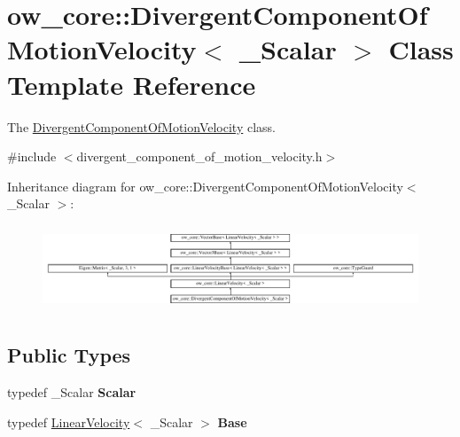 \hypertarget{classow__core_1_1DivergentComponentOfMotionVelocity}{}\section{ow\+\_\+core\+:\+:Divergent\+Component\+Of\+Motion\+Velocity$<$ \+\_\+\+Scalar $>$ Class Template Reference}
\label{classow__core_1_1DivergentComponentOfMotionVelocity}


The \hyperlink{classow__core_1_1DivergentComponentOfMotionVelocity}{Divergent\+Component\+Of\+Motion\+Velocity} class.  




{\ttfamily \#include $<$divergent\+\_\+component\+\_\+of\+\_\+motion\+\_\+velocity.\+h$>$}

Inheritance diagram for ow\+\_\+core\+:\+:Divergent\+Component\+Of\+Motion\+Velocity$<$ \+\_\+\+Scalar $>$\+:\begin{figure}[H]
\begin{center}
\leavevmode
\includegraphics[height=2.599814cm]{d0/d9b/classow__core_1_1DivergentComponentOfMotionVelocity}
\end{center}
\end{figure}
\subsection*{Public Types}
\begin{DoxyCompactItemize}
\item 
typedef \+\_\+\+Scalar {\bfseries Scalar}\hypertarget{classow__core_1_1DivergentComponentOfMotionVelocity_aae2adfaa7f9cbdf04e7d1fed98511cda}{}\label{classow__core_1_1DivergentComponentOfMotionVelocity_aae2adfaa7f9cbdf04e7d1fed98511cda}

\item 
typedef \hyperlink{classow__core_1_1LinearVelocity}{Linear\+Velocity}$<$ \+\_\+\+Scalar $>$ {\bfseries Base}\hypertarget{classow__core_1_1DivergentComponentOfMotionVelocity_a06d5fd35660d79e85bbb88edd31f9e50}{}\label{classow__core_1_1DivergentComponentOfMotionVelocity_a06d5fd35660d79e85bbb88edd31f9e50}

\end{DoxyCompactItemize}
